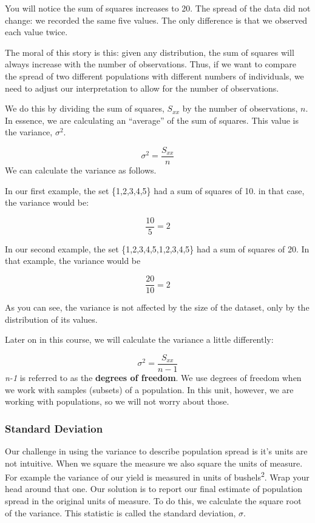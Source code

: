 \documentclass[
]{book}
\begin{document}
You will notice the sum of squares increases to 20. The spread of the
data did not change: we recorded the same five values. The only
difference is that we observed each value twice.

The moral of this story is this: given any distribution, the sum of
squares will always increase with the number of observations. Thus, if
we want to compare the spread of two different populations with
different numbers of individuals, we need to adjust our interpretation
to allow for the number of observations.

We do this by dividing the sum of squares, \(S_{xx}\) by the number of
observations, \(n\). In essence, we are calculating an ``average'' of the
sum of squares. This value is the variance, \(\sigma^2\).

\[\sigma^2 = \frac{S_{xx}}{n}\] We can calculate the variance as
follows.

In our first example, the set \{1,2,3,4,5\} had a sum of squares of 10. in
that case, the variance would be:

\[\frac{10}{5} = 2
\]

In our second example, the set \{1,2,3,4,5,1,2,3,4,5\} had a sum of
squares of 20. In that example, the variance would be

\[
\frac{20}{10} = 2
\]

As you can see, the variance is not affected by the size of the dataset,
only by the distribution of its values.

Later on in this course, we will calculate the variance a little
differently:

\[\sigma^2 = \frac{S_{xx}}{n-1}\] \emph{n-1} is referred to as the \textbf{degrees
of freedom}. We use degrees of freedom when we work with samples
(subsets) of a population. In this unit, however, we are working with
populations, so we will not worry about those.

\hypertarget{standard-deviation}{%
\subsubsection{Standard Deviation}\label{standard-deviation}}

Our challenge in using the variance to describe population spread is
it's units are not intuitive. When we square the measure we also square
the units of measure. For example the variance of our yield is measured
in units of bushels\textsuperscript{2}. Wrap your head around that one. Our solution is
to report our final estimate of population spread in the original units
of measure. To do this, we calculate the square root of the variance.
This statistic is called the standard deviation, \(\sigma\).
\end{document}
